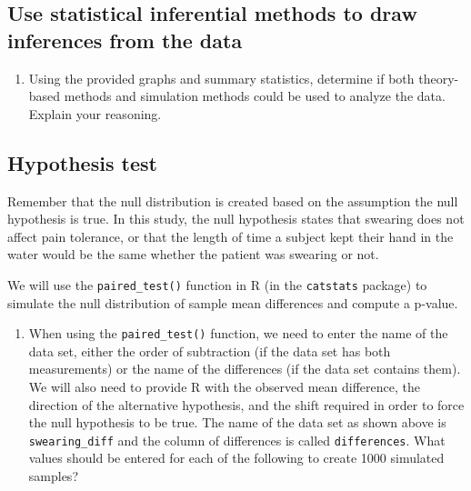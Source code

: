 \documentclass[
]{report}
\providecommand{\tightlist}{%
  \setlength{\itemsep}{0pt}\setlength{\parskip}{0pt}}
\begin{document}
\vspace{0.4in}

\hypertarget{use-statistical-inferential-methods-to-draw-inferences-from-the-data-2}{%
\subsection*{Use statistical inferential methods to draw inferences from the data}\label{use-statistical-inferential-methods-to-draw-inferences-from-the-data-2}}

\begin{enumerate}
\def\labelenumi{\arabic{enumi}.}
\setcounter{enumi}{7}
\tightlist
\item
  Using the provided graphs and summary statistics, determine if both theory-based methods and simulation methods could be used to analyze the data. Explain your reasoning.
\end{enumerate}

\vspace{1in}

\hypertarget{hypothesis-test-1}{%
\subsection*{Hypothesis test}\label{hypothesis-test-1}}

Remember that the null distribution is created based on the assumption the null hypothesis is true. In this study, the null hypothesis states that swearing does not affect pain tolerance, or that the length of time a subject kept their hand in the water would be the same whether the patient was swearing or not.

We will use the \texttt{paired\_test()} function in R (in the \texttt{catstats} package) to simulate the null distribution of sample mean differences and compute a p-value.

\newpage

\begin{enumerate}
\def\labelenumi{\arabic{enumi}.}
\setcounter{enumi}{8}
\tightlist
\item
  When using the \texttt{paired\_test()} function, we need to enter the name of the data set, either the order of subtraction (if the data set has both measurements) or the name of the differences (if the data set contains them). We will also need to provide R with the observed mean difference, the direction of the alternative hypothesis, and the shift required in order to force the null hypothesis to be true. The name of the data set as shown above is \texttt{swearing\_diff} and the column of differences is called \texttt{differences}. What values should be entered for each of the following to create 1000 simulated samples?
\end{enumerate}
\end{document}
